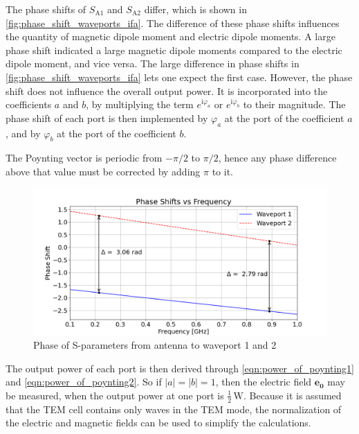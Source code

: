 The phase shifts of $S_{\mathrm{A1}}$ and $S_{\mathrm{A2}}$ differ, which is shown in \autoref{fig:phase_shift_waveports_ifa}. The difference of these phase shifts influences the quantity of magnetic dipole moment and electric dipole moments. A large phase shift indicated a large magnetic dipole moments compared to the electric dipole moment, and vice versa. The large difference in phase shifts in \autoref{fig:phase_shift_waveports_ifa} lets one expect the first case. However, the phase shift does not influence the overall output power. It is incorporated into the coefficients $a$ and $b$, by multiplying the term $e^{\mathrm{i}\varphi_{a}}$ or $e^{\mathrm{i}\varphi_{b}}$ to their magnitude. The phase shift of each port is then implemented by $\varphi_{a}$ at the port of the coefficient $a$, and by $\varphi_{b}$ at the port of the coefficient $b$. 

The Poynting vector is periodic from $-\pi/2$ to $\pi/2$, hence any phase difference above that value must be corrected by adding $\pi$ to it. 

\begin{figure}[h]
    \centering
    \includegraphics[width=1\linewidth]{Documentation//content//30_simulations//img/Phase Shift Waveports.png}
    \caption{Phase of S-parameters from antenna to waveport 1 and 2}
    \label{fig:phase_shift_waveports_ifa}
\end{figure}

The output power of each port is then derived through \autoref{eqn:power_of_poynting1} and \autoref{eqn:power_of_poynting2}. So if $|a|=|b|=1$, then the electric field $\mathbf{e_0}$ may be measured, when the output power at one port is $\frac{1}{2}\,\mathrm{W}$. Because it is assumed that the TEM cell contains only waves in the TEM mode, the normalization of the electric and magnetic fields can be used to simplify the calculations.

